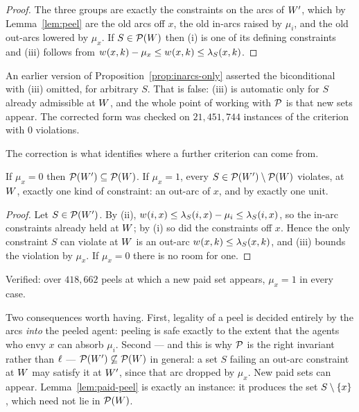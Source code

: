 \begin{proof}
The three groups are exactly the constraints on the arcs of $W'$,
which by Lemma~\ref{lem:peel} are the old arcs off $x$, the old in-arcs raised by
$\mu_i$, and the old out-arcs lowered by $\mu_x$. If $S \in
\mathcal{P}(W)$ then (i) is one of its defining constraints and (iii)
follows from $w_{}(x,k) - \mu_x \le w_{}(x,k) \le \lambda_S(x,k)$.
\end{proof}

\begin{remark}[A correction]
\label{rem:inarcs-corrected}
An earlier version of Proposition~\ref{prop:inarcs-only} asserted the
biconditional with (iii) omitted, for arbitrary $S$. That is false: (iii) is
automatic only for $S$ already admissible at $W$, and the whole point
of working with $\mathcal{P}$ is that new sets appear. The corrected form was
checked on $21{,}451{,}744$ instances of the criterion with $0$ violations.
\end{remark}

The correction is what identifies where a further criterion can come from.

\begin{lemma}
\label{lem:new-paidsets}
If $\mu_x = 0$ then $\mathcal{P}(W') \subseteq
\mathcal{P}(W)$. If $\mu_x = 1$, every $S \in
\mathcal{P}(W') \setminus \mathcal{P}(W)$ violates, at
$W$, exactly one kind of constraint: an out-arc of $x$, and by exactly
one unit.
\end{lemma}

\begin{proof}
Let $S \in \mathcal{P}(W')$. By (ii), $w_{}(i,x) \le \lambda_S(i,x)
- \mu_i \le \lambda_S(i,x)$, so the in-arc constraints already held at
$W$; by (i) so did the constraints off $x$. Hence the only constraint
$S$ can violate at $W$ is an out-arc $w_{}(x,k) \le
\lambda_S(x,k)$, and (iii) bounds the violation by $\mu_x$. If $\mu_x = 0$ there
is no room for one.
\end{proof}

Verified: over $418{,}662$ peels at which a new paid set appears, $\mu_x = 1$ in
every case.

Two consequences worth having. First, legality of a peel is decided entirely by
the arcs \emph{into} the peeled agent: peeling is safe exactly to the extent that
the agents who envy $x$ can absorb $\mu_i$. Second --- and this is why
$\mathcal{P}$ is the right invariant rather than $\ell_{}$ ---
$\mathcal{P}(W') \not\subseteq \mathcal{P}(W)$ in general: a
set $S$ failing an out-arc constraint at $W$ may satisfy it at
$W'$, since that arc dropped by $\mu_x$. New paid sets can appear.
Lemma~\ref{lem:paid-peel} is exactly an instance: it produces the set
$S \setminus \left\{x\right\}$, which need not lie in $\mathcal{P}(W)$.


